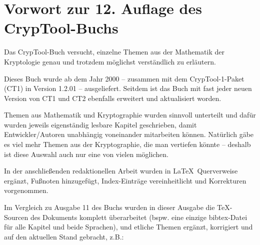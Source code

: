 
\chapter*{Vorwort zur 12. Auflage des CrypTool-Buchs}

Das CrypTool-Buch versucht, einzelne Themen aus der Mathematik der Kryptologie genau und trotzdem möglichst verständlich zu erläutern.

Dieses Buch wurde ab dem Jahr 2000 -- zusammen mit dem CrypTool-1-Paket (CT1) in Version 1.2.01 -- ausgeliefert.
Seitdem ist das Buch mit fast jeder neuen Version von CT1 und CT2 ebenfalls erweitert und aktualisiert worden.

Themen aus Mathematik und Kryptographie wurden sinnvoll unterteilt und dafür wurden jeweils eigenständig lesbare Kapitel geschrieben, damit  Entwickler/Autoren unabhängig voneinander mitarbeiten können. 
Natürlich gäbe es viel mehr Themen aus der Kryptographie, die man vertiefen könnte -- deshalb ist diese Auswahl auch nur eine von vielen möglichen.

In der anschließenden redaktionellen Arbeit wurden in \LaTeX\ Querverweise ergänzt, Fußnoten hinzugefügt, Index-Einträge vereinheitlicht und Korrekturen vorgenommen.

Im Vergleich zu Ausgabe 11 des Buchs wurden in dieser Ausgabe die TeX-Sourcen des Dokuments komplett überarbeitet (bspw. eine einzige bibtex-Datei für alle Kapitel und beide Sprachen), und etliche Themen ergänzt, korrigiert und auf den aktuellen Stand gebracht, z.B.:

